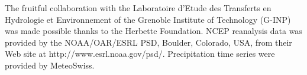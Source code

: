 \documentclass{ametsoc}
\begin{document}
The fruitful collaboration with the Laboratoire d'Etude des Transferts en Hydrologie et Environnement of the Grenoble Institute of Technology (G-INP) was made possible thanks to the Herbette Foundation. NCEP reanalysis data was provided by the NOAA/OAR/ESRL PSD, Boulder, Colorado, USA, from their Web site at http://www.esrl.noaa.gov/psd/. Precipitation time series were provided by MeteoSwiss. 


%






%
%
%


\end{document}
